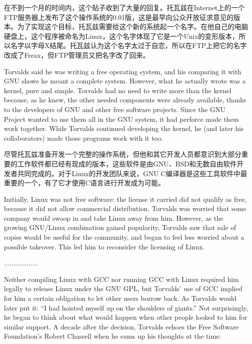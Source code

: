 \ifdefined\chs
在不到一个月的时间内，这个贴子收到了大量的回复。托瓦兹在Internet上的一个FTP服务器上发布了这个操作系统的0.01版，这是最早向公众开放征求意见的版本。为了实现这个目标，托瓦兹需要给这个新的系统起一个名字。在他自己的电脑硬盘上，这个程序被命名为Linux，这个名字体现了它是一个Unix的变形版本，所以名字以字母X结尾。托瓦兹认为这个名字太过于自恋，所以在FTP上把它的名字改成了Freax，但FTP管理员又把名字改了回来。
\fi

\ifdefined\eng
Torvalds said he was writing a free operating system, and his comparing it with GNU shows he meant a complete system.  However, what he actually wrote was a kernel, pure and simple. Torvalds had no need to write more than the kernel because, as he knew, the other needed components were already available, thanks to the developers of GNU and other free software projects.  Since the GNU Project wanted to use them all in the GNU system, it had perforce made them work together.  While Torvalds continued developing the kernel, he (and later his collaborators) made those programs work with it too.
\fi

\ifdefined\chs
尽管托瓦兹准备开发一个完整的操作系统，但他和其它开发人员都意识到大部分重要的工作软件都已经有现成的版本，这些软件是由GNU、BSD和无数自由软件开发者共同完成的。对于Linux的开发团队来说，GNU C编译器是这些工具软件中最重要的一个，有了它才使用C语言进行开发成为可能。
\fi

\ifdefined\eng
Initially, Linux was not free software: the license it carried did not qualify as free, because it did not allow commercial distribution. Torvalds was worried that some company would swoop in and take Linux away from him.  However, as the growing GNU/Linux combination gained popularity, Torvalds saw that sale of copies would be useful for the community, and began to feel less worried about a possible takeover. This led him to reconsider the licensing of Linux.
\fi

\ifdefined\chs
..................
\fi

\ifdefined\eng
Neither compiling Linux with GCC nor running GCC with Linux required him legally to release Linux under the GNU GPL, but Torvalds' use of GCC implied for him a certain obligation to let other users borrow back. As Torvalds would later put it: ``I had hoisted myself up on the shoulders of giants.'' Not surprisingly, he began to think about what would happen when other people looked to him for similar support. A decade after the decision, Torvalds echoes the Free Software Foundation's Robert Chassell when he sums up his thoughts at the time:
\fi

